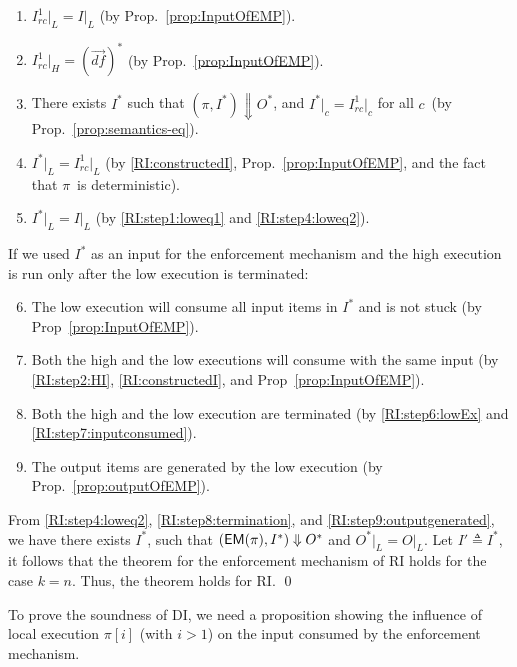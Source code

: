 \documentclass[10pt,a4paper,oneside]{article}
\def\execution#1#2#3{\ensuremath{(#1, #2)\Downarrow#3}}
\def\defseq#1{\ensuremath{#1 = (\defvec)^*}}
\def\loweq#1#2{\ensuremath{\restrict{#1}{L} = \restrict{#2}{L}}}
\def\Irc#1{\ensuremath{I_{rc}^{#1}}}
\def\channeleq#1#2#3{\ensuremath{\restrict{#1}{#3} = \restrict{#2}{#3}}}
\def\restrict#1#2{\ensuremath{{#1}|_{#2}}}
\def\chnl{\ensuremath{c}}
\def\sanserif#1{\ensuremath{\sf #1}}
\def\defvec{\ensuremath{\vec{df}}}
\def\EM{\ensuremath{{\sanserif{EM}}}}
\def\Prog{\ensuremath{\pi}}
\def\Progl#1{\ensuremath{\Prog[#1]}}
\def\EMP{\ensuremath{\EM(}\ensuremath{\Prog)}}
\begin{document}
\begin{enumerate}
\item \loweq{\Irc{1}}{I} (by Prop.~\ref{prop:InputOfEMP}). \label{RI:step1:loweq1}

\item \defseq{\Irc{1}|_H} (by Prop.~\ref{prop:InputOfEMP}). \label{RI:step2:HI}

\item There exists $I^*$ such that \execution{\Prog}{I^*}{O^*}, and  \channeleq{I^*}{\Irc{1}}{\chnl} for all \chnl\ (by Prop.~\ref{prop:semantics-eq}). \label{RI:constructedI}
\item \loweq{I^*}{\Irc{1}} (by \ref{RI:constructedI}, Prop.~\ref{prop:InputOfEMP}, and  the fact that \Prog\ is deterministic). \label{RI:step4:loweq2}
\item \loweq{I^*}{I} (by \ref{RI:step1:loweq1} and \ref{RI:step4:loweq2}).
\end{enumerate}

If we used $I^*$ as an input for the enforcement mechanism and the high execution is run only after the low execution is terminated:
\begin{enumerate}
\setcounter{enumi}{5}
\item The low execution will consume all input items in $I^*$ and is not stuck (by Prop~\ref{prop:InputOfEMP}). \label{RI:step6:lowEx}


\item Both the high and the low executions will consume with the same input (by \ref{RI:step2:HI}, \ref{RI:constructedI}, and Prop~\ref{prop:InputOfEMP}). \label{RI:step7:inputconsumed}

\item \label{termination} Both the high and the low execution are terminated (by \ref{RI:step6:lowEx} and \ref{RI:step7:inputconsumed}). \label{RI:step8:termination}

\item The output items are generated by the low execution (by Prop.~\ref{prop:outputOfEMP}). \label{RI:step9:outputgenerated}
\end{enumerate}


From \ref{RI:step4:loweq2}, \ref{RI:step8:termination}, and \ref{RI:step9:outputgenerated}, we have there exists $I^*$, such that \execution{\EMP}{I^*}{O^*} and \loweq{O^*}{O}. Let $I' \triangleq I^*$, it follows that the theorem for the enforcement mechanism of RI holds for the case $k = n$. Thus, the theorem holds for RI. \qed

To prove the soundness of DI, we need a proposition showing the influence of local execution \Progl{i} (with $i > 1$) on the input consumed by the enforcement mechanism.
\end{document}
